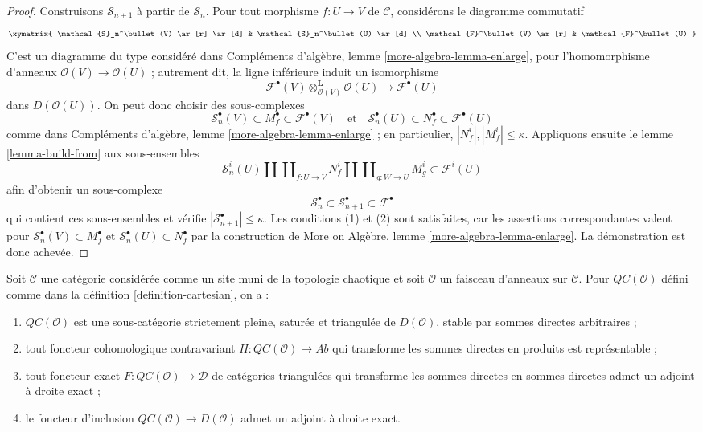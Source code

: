 \begin{proof}
\medskip\noindent
Construisons $\mathcal{S}_{n + 1}$ à partir de $\mathcal{S}_n$. Pour tout
morphisme $f : U \to V$ de $\mathcal{C}$, considérons le diagramme commutatif
$$
\xymatrix{
\mathcal{S}_n^\bullet(V)
\ar[r] \ar[d] &
\mathcal{S}_n^\bullet(U) \ar[d] \\
\mathcal{F}^\bullet(V)
\ar[r] &
\mathcal{F}^\bullet(U)
}
$$
C'est un diagramme du type considéré dans Compléments d'algèbre, lemme
\ref{more-algebra-lemma-enlarge}, pour l'homomorphisme d'anneaux
$\mathcal{O}(V) \to \mathcal{O}(U)$ ; autrement dit, la ligne inférieure
induit un isomorphisme
$$
\mathcal{F}^\bullet(V) \otimes_{\mathcal{O}(V)}^\mathbf{L} \mathcal{O}(U)
\longrightarrow
\mathcal{F}^\bullet(U)
$$
dans $D(\mathcal{O}(U))$. On peut donc choisir des sous-complexes
$$
\mathcal{S}_n^\bullet(V) \subset M^\bullet_f \subset \mathcal{F}^\bullet(V)
\quad\text{et}\quad
\mathcal{S}_n^\bullet(U) \subset N^\bullet_f \subset \mathcal{F}^\bullet(U)
$$
comme dans Compléments d'algèbre, lemme \ref{more-algebra-lemma-enlarge} ; en
particulier, $|N^i_f|, |M^i_f| \leq \kappa$. Appliquons ensuite le lemme
\ref{lemma-build-from} aux sous-ensembles
$$
\mathcal{S}_n^i(U) \amalg \coprod\nolimits_{f : U \to V} N^i_f
\amalg \coprod\nolimits_{g : W \to U} M^i_g
\subset
\mathcal{F}^i(U)
$$
afin d'obtenir un sous-complexe
$$
\mathcal{S}_n^\bullet \subset
\mathcal{S}_{n + 1}^\bullet \subset
\mathcal{F}^\bullet
$$
qui contient ces sous-ensembles et vérifie
$|\mathcal{S}_{n + 1}^\bullet| \leq \kappa$. Les conditions (1) et (2) sont
satisfaites, car les assertions correspondantes valent pour
$\mathcal{S}_n^\bullet(V) \subset M^\bullet_f$ et
$\mathcal{S}_n^\bullet(U) \subset N^\bullet_f$ par la construction de More
on Algèbre, lemme \ref{more-algebra-lemma-enlarge}. La démonstration est donc
achevée.
\end{proof}

\begin{proposition}
\label{proposition-cartesian-brown}
Soit $\mathcal{C}$ une catégorie considérée comme un site muni de la
topologie chaotique et soit $\mathcal{O}$ un faisceau d'anneaux sur
$\mathcal{C}$. Pour $\mathit{QC}(\mathcal{O})$ défini comme dans la définition
\ref{definition-cartesian}, on a :
\begin{enumerate}
\item $\mathit{QC}(\mathcal{O})$ est une sous-catégorie strictement pleine,
saturée et triangulée de $D(\mathcal{O})$, stable par sommes directes
arbitraires ;
\item tout foncteur cohomologique contravariant
$H : \mathit{QC}(\mathcal{O}) \to \textit{Ab}$
qui transforme les sommes directes en produits est représentable ;
\item tout foncteur exact $F : \mathit{QC}(\mathcal{O}) \to \mathcal{D}$ de
catégories triangulées qui transforme les sommes directes en sommes directes
admet un adjoint à droite exact ;
\item le foncteur d'inclusion
$\mathit{QC}(\mathcal{O}) \to D(\mathcal{O})$ admet un adjoint à droite exact.
\end{enumerate}
\end{proposition}

